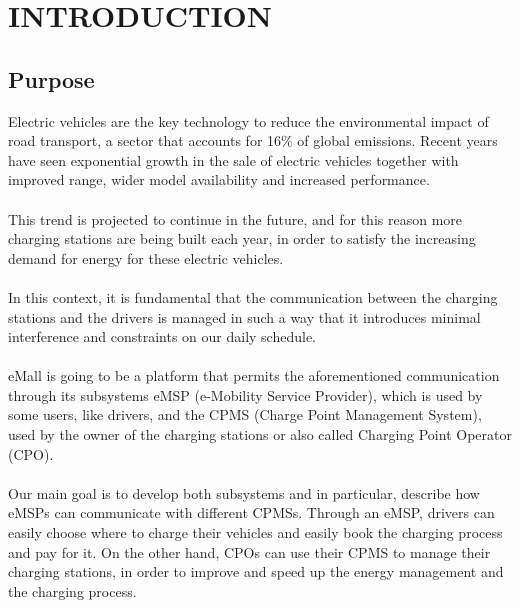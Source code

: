 \newcommand\row{\stepcounter{row}\arabic{row}}
\chapter{INTRODUCTION}
\label{ch:introduction}%

\section{Purpose}
Electric vehicles are the key technology to reduce the environmental impact of road transport, a sector that accounts for 16\% of global emissions. Recent years have seen exponential growth in the sale of electric vehicles together with improved range, wider model availability and increased performance. \\ \\
This trend is projected to continue in the future, and for this reason more charging stations are being built each year, in order to satisfy the increasing demand for energy for these electric vehicles. \\ \\
In this context, it is fundamental that the communication between the charging stations and the drivers is managed in such a way that it introduces minimal interference and constraints on 
our daily schedule. \\ \\
eMall is going to be a platform that permits the aforementioned communication through its subsystems eMSP (e-Mobility Service Provider), which is used by some users, like drivers, and the CPMS (Charge Point Management System), used by the owner of the charging stations or also called Charging Point Operator (CPO). \\ \\
Our main goal is to develop both subsystems and in particular, describe how eMSPs can communicate with different CPMSs. Through an eMSP, drivers can easily choose where to charge their vehicles and easily book the charging process and pay for it. On the other hand, CPOs can use their CPMS to manage their charging stations, in order to improve and speed up the energy management and the charging process.
\label{sec:purpose}
